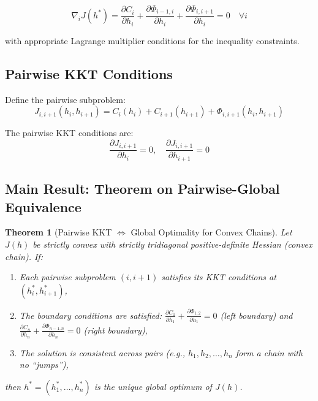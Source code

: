 \documentclass[12pt]{article}
\newtheorem{theorem}{Theorem}[section]
\theoremstyle{definition}
\begin{document}
\[
\nabla_i J(h^*) = \frac{\partial C_i}{\partial h_i} + \frac{\partial \Phi_{i-1,i}}{\partial h_i} + \frac{\partial \Phi_{i,i+1}}{\partial h_i} = 0 \quad \forall i
\]

with appropriate Lagrange multiplier conditions for the inequality constraints.

\subsection{Pairwise KKT Conditions}

Define the pairwise subproblem:
\[
J_{i,i+1}(h_i, h_{i+1}) = C_i(h_i) + C_{i+1}(h_{i+1}) + \Phi_{i,i+1}(h_i, h_{i+1})
\]

The pairwise KKT conditions are:
\[
\frac{\partial J_{i,i+1}}{\partial h_i} = 0, \quad \frac{\partial J_{i,i+1}}{\partial h_{i+1}} = 0
\]

\subsection{Main Result: Theorem on Pairwise-Global Equivalence}

\begin{theorem}[Pairwise KKT $\Leftrightarrow$ Global Optimality for Convex Chains]
Let $J(h)$ be strictly convex with strictly tridiagonal positive-definite Hessian (convex chain). If:
\begin{enumerate}
    \item Each pairwise subproblem $(i, i+1)$ satisfies its KKT conditions at $(h_i^*, h_{i+1}^*)$,
    \item The boundary conditions are satisfied: $\frac{\partial C_1}{\partial h_1} + \frac{\partial \Phi_{1,2}}{\partial h_1} = 0$ (left boundary) and $\frac{\partial C_n}{\partial h_n} + \frac{\partial \Phi_{n-1,n}}{\partial h_n} = 0$ (right boundary),
    \item The solution is consistent across pairs (e.g., $h_1, h_2, \ldots, h_n$ form a chain with no ``jumps''),
\end{enumerate}
then $h^* = (h_1^*, \ldots, h_n^*)$ is the unique global optimum of $J(h)$.
\end{theorem}
\end{document}

